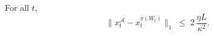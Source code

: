 


\begin{Thm:Lemma}
\label{lem:x-gap-bound}
For all \(t\),
\[
\|x_t^{\mathcal{A}} - x_t^{\pi(W_t)}\|_1
\;\le\;
2\,\frac{\eta L}{\kappa^2}.
\]
\end{Thm:Lemma}

